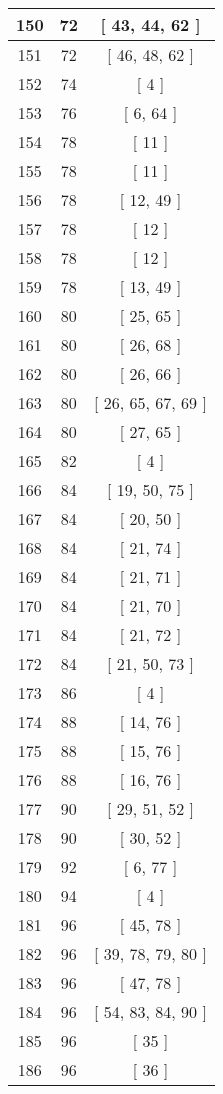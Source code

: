 \begin{center}
\begin{longtable}[H]{|| c c c ||}
150 & 72 & [ 43, 44, 62 ]
\\\hline
151 & 72 & [ 46, 48, 62 ]
\\\hline
152 & 74 & [ 4 ]
\\\hline
153 & 76 & [ 6, 64 ]
\\\hline
154 & 78 & [ 11 ]
\\\hline
155 & 78 & [ 11 ]
\\\hline
156 & 78 & [ 12, 49 ]
\\\hline
157 & 78 & [ 12 ]
\\\hline
158 & 78 & [ 12 ]
\\\hline
159 & 78 & [ 13, 49 ]
\\\hline
160 & 80 & [ 25, 65 ]
\\\hline
161 & 80 & [ 26, 68 ]
\\\hline
162 & 80 & [ 26, 66 ]
\\\hline
163 & 80 & [ 26, 65, 67, 69 ]
\\\hline
164 & 80 & [ 27, 65 ]
\\\hline
165 & 82 & [ 4 ]
\\\hline
166 & 84 & [ 19, 50, 75 ]
\\\hline
167 & 84 & [ 20, 50 ]
\\\hline
168 & 84 & [ 21, 74 ]
\\\hline
169 & 84 & [ 21, 71 ]
\\\hline
170 & 84 & [ 21, 70 ]
\\\hline
171 & 84 & [ 21, 72 ]
\\\hline
172 & 84 & [ 21, 50, 73 ]
\\\hline
173 & 86 & [ 4 ]
\\\hline
174 & 88 & [ 14, 76 ]
\\\hline
175 & 88 & [ 15, 76 ]
\\\hline
176 & 88 & [ 16, 76 ]
\\\hline
177 & 90 & [ 29, 51, 52 ]
\\\hline
178 & 90 & [ 30, 52 ]
\\\hline
179 & 92 & [ 6, 77 ]
\\\hline
180 & 94 & [ 4 ]
\\\hline
181 & 96 & [ 45, 78 ]
\\\hline
182 & 96 & [ 39, 78, 79, 80 ]
\\\hline
183 & 96 & [ 47, 78 ]
\\\hline
184 & 96 & [ 54, 83, 84, 90 ]
\\\hline
185 & 96 & [ 35 ]
\\\hline
186 & 96 & [ 36 ]
\\\hline

\end{longtable}
\end{center}
